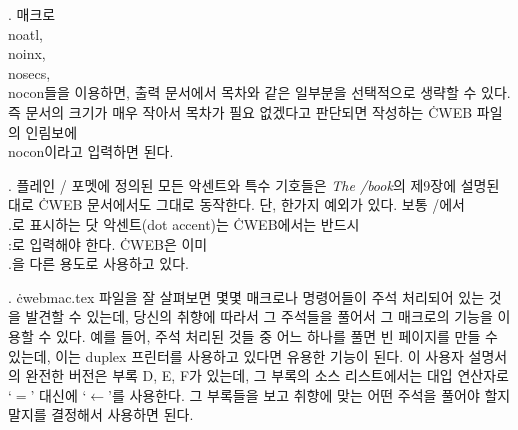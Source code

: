 {%
. 매크로 \.{\\noatl}, \.{\\noinx}, \.{\\nosecs}, \.{\\nocon}들을
이용하면, 출력 문서에서 목차와 같은 일부분을 선택적으로 생략할 수
있다. 즉 문서의 크기가 매우 작아서 목차가 필요 없겠다고 판단되면
작성하는 \.{CWEB} 파일의 인림보에 \.{\\nocon}이라고 입력하면 된다.

. 플레인 \TEX/ 포멧에 정의된 모든 악센트와 특수
기호들은 {\sl The \TEX/book\/}의 제9장에 설명된 대로 \.{CWEB}
문서에서도 그대로 동작한다. 단, 한가지 예외가 있다.
보통 \TEX/에서 \.{\\.}로 표시하는 닷 악센트(dot
accent)는 \.{CWEB}에서는 반드시 \.{\\:}로 입력해야 한다. \.{CWEB}은
이미 \.{\\.}을 다른 용도로 사용하고 있다.

. \.{cwebmac.tex} 파일을 잘 살펴보면 몇몇 매크로나
명령어들이 주석 처리되어 있는 것을 발견할 수 있는데, 당신의 취향에
따라서 그 주석들을 풀어서 그 매크로의 기능을 이용할 수 있다. 예를 들어, 주석 처리된
것들 중 어느 하나를 풀면 빈 페이지를 만들 수 있는데, 이는 duplex
프린터를 사용하고 있다면 유용한 기능이 된다. 이 사용자 설명서의 완전한
버전은 부록 D, E, F가 있는데, 그 부록의 소스 리스트에서는 대입
연산자로 `$=$' 대신에 `$\gets$'를 사용한다. 그 부록들을 보고 취향에
맞는 어떤 주석을 풀어야 할지 말지를 결정해서 사용하면 된다.

}
